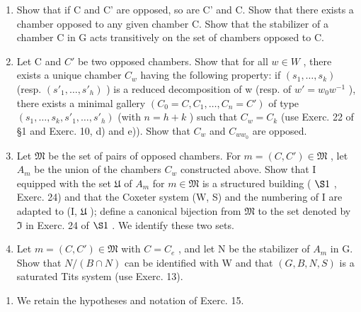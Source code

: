 \begin{enumerate}
\def\labelenumi{\alph{enumi})}
\item
  Show that if C and C' are opposed, so are C' and C. Show that there exists a chamber opposed to any given chamber C. Show that the stabilizer of a chamber C in G acts transitively on the set of chambers opposed to C.
\item
  Let C and \(C'\) be two opposed chambers. Show that for all \(w \in W\) , there exists a unique chamber \(C_w\) having the following property: if \((s_1, \ldots, s_k)\) (resp. \((s'_1, \ldots, s'_h)\) ) is a reduced decomposition of w (resp. of \(w' = w_0 w^{-1}\) ), there exists a minimal gallery \((C_0 = C, C_1, \ldots, C_n = C')\) of type \((s_1, \ldots, s_k, s'_1, \ldots, s'_h)\) (with \(n = h + k\) ) such that \(C_w = C_k\) (use Exerc. 22 of §1 and Exerc. 10, d) and e)). Show that \(C_w\) and \(C_{ww_0}\) are opposed.
\item
  Let \(\mathfrak{M}\) be the set of pairs of opposed chambers. For \(m = (C, C') \in \mathfrak{M}\) , let \(A_m\) be the union of the chambers \(C_w\) constructed above. Show that I equipped with the set \(\mathfrak{U}\) of \(A_m\) for \(m \in \mathfrak{M}\) is a structured building ( \(\S 1\) , Exerc. 24) and that the Coxeter system (W, S) and the numbering of I are adapted to (I, \(\mathfrak{U}\) ); define a canonical bijection from \(\mathfrak{M}\) to the set denoted by \(\mathfrak{I}\) in Exerc. 24 of \(\S 1\) . We identify these two sets.
\item
  Let \(m = (C, C') \in \mathfrak{M}\) with \(C = C_e\) , and let N be the stabilizer of \(A_m\) in G. Show that \(N/(B \cap N)\) can be identified with W and that \((G, B, N, S)\) is a saturated Tits system (use Exerc. 13).
\end{enumerate}

\begin{enumerate}
\def\labelenumi{\arabic{enumi})}
\setcounter{enumi}{15}
\tightlist
\item
  We retain the hypotheses and notation of Exerc. 15.
\end{enumerate}

